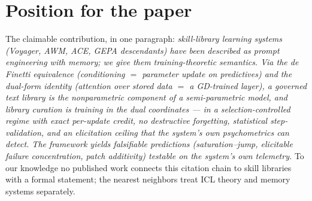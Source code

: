 \documentclass[11pt]{article}
\theoremstyle{plain}
\theoremstyle{definition}
\theoremstyle{remark}
\begin{document}
\section{Position for the paper}

The claimable contribution, in one paragraph: \emph{skill-library learning
systems (Voyager, AWM, ACE, GEPA descendants) have been described as prompt
engineering with memory; we give them training-theoretic semantics. Via the
de Finetti equivalence (conditioning $=$ parameter update on predictives)
and the dual-form identity (attention over stored data $=$ a GD-trained
layer), a governed text library is the nonparametric component of a
semi-parametric model, and library curation is training in the dual
coordinates --- in a selection-controlled regime with exact per-update
credit, no destructive forgetting, statistical step-validation, and an
elicitation ceiling that the system's own psychometrics can detect. The
framework yields falsifiable predictions (saturation--jump, elicitable
failure concentration, patch additivity) testable on the system's own
telemetry.} To our knowledge no published work connects this citation chain
to skill libraries with a formal statement; the nearest neighbors treat ICL
theory and memory systems separately.
\end{document}
